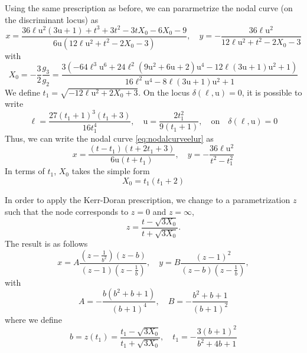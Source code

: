 \documentclass[11pt, a4paper]{article}
\newcommand{\ur}{\mathrm{u}}
\numberwithin{equation}{section}
\begin{document}
Using the same prescription as before, we can pararmetrize the nodal curve (on the discriminant locus) as
\begin{equation}\label{eq:nodalcurveelur}
  x = \frac{36 \ell \ur^2 (3 \ur+1)+t^3+3 t^2-3 t X_0-6 X_0-9}{6 \ur \left(12 \ell \ur^2+t^2-2 X_0-3\right)}, \quad y = -\frac{36 \ell \ur^2}{12 \ell \ur^2+t^2-2 X_0-3}
\end{equation}
with
\begin{equation}
  X_0 = -\frac{3}{2}\frac{g_3}{g_2} = \frac{3 \left(-64 \ell^3 \ur^6+24 \ell^2 \left(9 \ur^2+6 \ur+2\right) \ur^4-12 \ell (3 \ur+1) \ur^2+1\right)}{16 \ell^2 \ur^4-8 \ell (3 \ur+1) \ur^2+1}
\end{equation}
We define $t_1 = \sqrt{-12 \ell \ur^2+2 X_0+3}$. On the locus $\delta(\ell, \ur) =0$, it is possible to write
\begin{equation}\label{eq:elurt1}
  \ell = \frac{27 (t_1+1)^3 (t_1+3)}{16 t_1^4}, \quad \ur = \frac{2 t_1^2}{9 (t_1+1)}, \quad \text{on} \quad \delta(\ell, \ur) = 0
\end{equation}
Thus, we can write the nodal curve \cref{eq:nodalcurveelur} as
\begin{equation}
  x = \frac{(t-t_1) (t+2 t_1+3)}{6 \ur (t+t_1)}, \quad y = -\frac{36 \ell \ur^2}{t^2-t_1^2}
\end{equation}
In terms of $t_1$, $X_0$ takes the simple form
\begin{equation}
  X_0 = t_1 (t_1+2)
\end{equation}

In order to apply the Kerr-Doran prescription, we change to a parametrization $z$ such that the node corresponds to $z = 0$ and $z = \infty$,
\begin{equation}
  z = \frac{t-\sqrt{3 X_0}}{t+\sqrt{3 X_0}}.
\end{equation}
The result is as follows
\begin{equation}
  x = A \frac{(z-\tfrac{1}{b^2})(z-b)}{(z-1)(z-\tfrac{1}{b})}, \quad y = B \frac{(z-1)^2}{(z-b)(z-\tfrac{1}{b})},
\end{equation}
with
\begin{equation}
  A = -\frac{b \left(b^2+b+1\right)}{(b+1)^4}, \quad B = -\frac{b^2+b+1}{(b+1)^2}
\end{equation}
where we define
\begin{equation}
  b = z(t_1) = \frac{t_1-\sqrt{3 X_0}}{t_1+\sqrt{3 X_0}}, \quad t_1 = -\frac{3 (b+1)^2}{b^2+4 b+1}
\end{equation}
\end{document}
